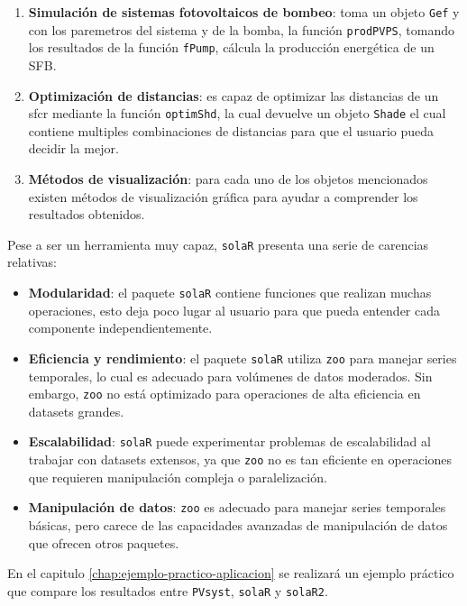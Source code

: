 \begin{enumerate}
\item \textbf{Simulación de sistemas fotovoltaicos de bombeo}: toma un objeto \texttt{Gef} y con los paremetros del sistema y de la bomba, la función \texttt{prodPVPS}, tomando los resultados de la función \texttt{fPump}, cálcula la producción energética de un SFB.
\item \textbf{Optimización de distancias}: es capaz de optimizar las distancias de un sfcr mediante la función \texttt{optimShd}, la cual devuelve un objeto \texttt{Shade} el cual contiene multiples combinaciones de distancias para que el usuario pueda decidir la mejor.
\item \textbf{Métodos de visualización}: para cada uno de los objetos mencionados existen métodos de visualización gráfica para ayudar a comprender los resultados obtenidos.
\end{enumerate}

Pese a ser un herramienta muy capaz, \texttt{solaR} presenta una serie de carencias relativas:
\begin{itemize}
\item \textbf{Modularidad}: el paquete \texttt{solaR} contiene funciones que realizan muchas operaciones, esto deja poco lugar al usuario para que pueda entender cada componente independientemente.
\item \textbf{Eficiencia y rendimiento}: el paquete \texttt{solaR} utiliza \texttt{zoo} para manejar series temporales, lo cual es adecuado para volúmenes de datos moderados. Sin embargo, \texttt{zoo} no está optimizado para operaciones de alta eficiencia en datasets grandes.
\item \textbf{Escalabilidad}: \texttt{solaR} puede experimentar problemas de escalabilidad al trabajar con datasets extensos, ya que \texttt{zoo} no es tan eficiente en operaciones que requieren manipulación compleja o paralelización.
\item \textbf{Manipulación de datos}: \texttt{zoo} es adecuado para manejar series temporales básicas, pero carece de las capacidades avanzadas de manipulación de datos que ofrecen otros paquetes.
\end{itemize}

En el capitulo \ref{chap:ejemplo-practico-aplicacion} se realizará un ejemplo práctico que compare los resultados entre \texttt{PVsyst}, \texttt{solaR} y \texttt{solaR2}.
